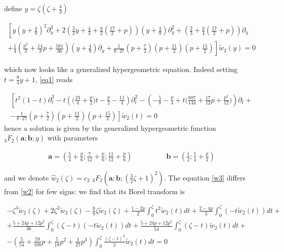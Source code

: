 \documentclass{article}
\theoremstyle{definition}
\begin{document}
define $y=\zeta\left(\zeta+\frac{4}{3}\right)$

\begin{multline}\label{eq1}
\left[y\left(y+\frac{4}{9}\right)^2\partial_y^3+2\left(\frac{3}{2}y+\frac{4}{3}+\frac{y}{2}\left(\frac{17}{2}+p\right)\right)\left(y+\frac{4}{9}\right)\partial_y^2+\left(\frac{2}{3}+\frac{y}{4}\left(\frac{17}{2}+p\right)\right)\partial_y\right.\\
\left.+\frac{1}{4}\left(\frac{p^3}{3}+\frac{14}{3}p+\frac{581}{36}\right)\left(y+\frac{4}{9}\right)\partial_y+\frac{1}{8\cdot 27}\left(p+\frac{7}{2}\right)\left(p+\frac{11}{2}\right)\left(p+\frac{15}{2}\right)\right]\tilde{w}_2(y)=0
\end{multline}

which now looks like a generalized hypergeometric equation. Indeed setting $t=\tfrac{9}{4}y+1$, \eqref{eq1} reads

\begin{multline}
\left[t^2(1-t)\partial_t^3-t\left(\big(\frac{23}{4}+\frac{p}{2}\big)t-\frac{p}{2}-\frac{11}{4}\right)\partial_t^2-\left(-\frac{5}{8}-\frac{p}{4}+t\Big(\frac{887}{144}+\frac{17}{12}p+\frac{p^2}{12}\Big)\right)\partial_t +\right.\\
\left. -\frac{1}{8\cdot 27}\left(p+\frac{7}{2}\right)\left(p+\frac{11}{2}\right)\left(p+\frac{15}{2}\right)\right]\tilde{w}_2(t)=0
\end{multline}
hence a solution is given by the generalized hypergeometric function ${}_3F_2\left(\mathbf{a};\mathbf{b};y\right)$ with parameters

\begin{align*}
\mathbf{a}=\left(\frac{5}{4}+\frac{p}{6};\frac{7}{12}+\frac{p}{6};\frac{11}{12}+\frac{p}{6}\right) & \qquad\qquad \mathbf{b}=\left(\frac{1}{2};\frac{5}{4}+\frac{p}{2}\right)
\end{align*}

and we denote $\hat{w}_2(\zeta)=c_2\,\, {}_3F_2\left(\mathbf{a};\mathbf{b};\left(\tfrac{3}{2}\zeta+1\right)^2\right)$. The equation \eqref{w3} differs from \eqref{w2} for few signs: we find that its Borel transform is 

\begin{multline}
-\zeta^3\tilde{w}_2(\zeta)+2\zeta^2\tilde{w}_2(\zeta)-\frac{8}{9}\zeta\tilde{w}_2(\zeta)+\frac{1-2p}{2}\int_0^\zeta t^2\tilde{w}_2(t)dt+\frac{2-4p}{3}\int_0^\zeta(-t\tilde{w}_2(t))dt+\\
+\frac{5+24p+12p^2}{36}\int_0^\zeta(\zeta-t)(-t\tilde{w}_2(t))dt
+\frac{5+24p+12p^2}{54}\int_0^\zeta(\zeta-t)\tilde{w}_2(t)dt +\\
-\left(\frac{5}{54}+\frac{59}{108}p+\frac{5}{18}p^2+\frac{1}{27}p^3\right)\int_0^\zeta\frac{(\zeta-t)^2}{2}\tilde{w}_2(t)dt=0
\end{multline}
\end{document}
